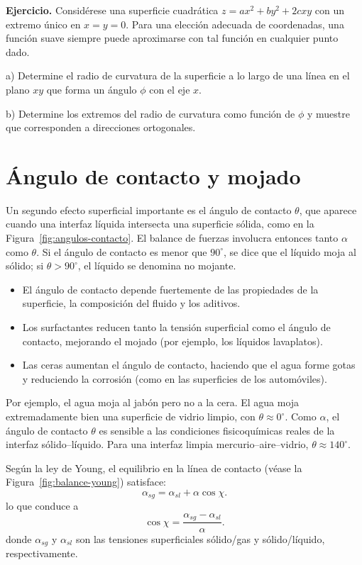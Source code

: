 \textbf{Ejercicio.} Considérese una superficie cuadrática $z = ax^2 + by^2 + 2cxy$ con un extremo único en $x = y = 0$. Para una elección adecuada de coordenadas, una función suave siempre puede aproximarse con tal función en cualquier punto dado.

a) Determine el radio de curvatura de la superficie a lo largo de una línea en el plano $xy$ que forma un ángulo $\phi$ con el eje $x$.

b) Determine los extremos del radio de curvatura como función de $\phi$ y muestre que corresponden a direcciones ortogonales.

\section{Ángulo de contacto y mojado}

Un segundo efecto superficial importante es el ángulo de contacto $\theta$, que aparece cuando una interfaz líquida intersecta una superficie sólida, como en la Figura~\ref{fig:angulos-contacto}. El balance de fuerzas involucra entonces tanto $\alpha$ como $\theta$. Si el ángulo de contacto es menor que $90^\circ$, se dice que el líquido moja al sólido; si $\theta > 90^\circ$, el líquido se denomina no mojante.

\figuraAngulosContacto

\begin{itemize}
\item El ángulo de contacto depende fuertemente de las propiedades de la superficie, la composición del fluido y los aditivos.
\item Los surfactantes reducen tanto la tensión superficial como el ángulo de contacto, mejorando el mojado (por ejemplo, los líquidos lavaplatos).
\item Las ceras aumentan el ángulo de contacto, haciendo que el agua forme gotas y reduciendo la corrosión (como en las superficies de los automóviles).
\end{itemize}

Por ejemplo, el agua moja al jabón pero no a la cera. El agua moja extremadamente bien una superficie de vidrio limpio, con $\theta \approx 0^\circ$. Como $\alpha$, el ángulo de contacto $\theta$ es sensible a las condiciones fisicoquímicas reales de la interfaz sólido--líquido. Para una interfaz limpia mercurio--aire--vidrio, $\theta \approx 140^\circ$.

Según la ley de Young, el equilibrio en la línea de contacto (véase la Figura~\ref{fig:balance-young}) satisface:
$$ \alpha_{sg} = \alpha_{sl} + \alpha\cos\chi. $$
lo que conduce a
$$ \cos\chi = \frac{\alpha_{sg} - \alpha_{sl}}{\alpha}. $$
donde $\alpha_{sg}$ y $\alpha_{sl}$ son las tensiones superficiales sólido/gas y sólido/líquido, respectivamente.

